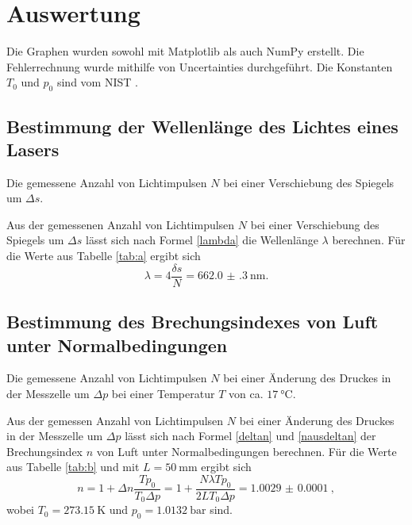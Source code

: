 \section{Auswertung}
\label{sec:Auswertung}


Die Graphen wurden sowohl mit Matplotlib \cite{matplotlib} als auch NumPy \cite{numpy} erstellt. Die
Fehlerrechnung wurde mithilfe von Uncertainties \cite{uncertainties} durchgeführt.
Die Konstanten $T_0$ und $p_0$ sind vom NIST \cite{nistgov}.

\subsection{Bestimmung der Wellenlänge des Lichtes eines Lasers}
\begin{table}
	\centering
	\caption{Die gemessene Anzahl von Lichtimpulsen $N$ bei einer Verschiebung des Spiegels um $\Delta s$.}
	
	\label{tab:a}
\end{table}
Aus der gemessenen Anzahl von Lichtimpulsen $N$ bei einer Verschiebung des Spiegels um $\Delta s$ lässt sich nach Formel \eqref{lambda} die Wellenlänge $\lambda$ berechnen.
Für die Werte aus Tabelle \ref{tab:a} ergibt sich
\begin{equation}
	\lambda = 4 \frac{\delta s}{N}=\SI{662.0(3)}{\nano\meter}.
\end{equation}


\subsection{Bestimmung des Brechungsindexes von Luft unter Normalbedingungen}
\begin{table}
	\centering
	\caption{Die gemessene Anzahl von Lichtimpulsen $N$ bei einer Änderung des Druckes in der Messzelle um $\Delta p$ bei einer Temperatur $T$ von ca. $\SI{17}{\degreeCelsius}$.}
	
	\label{tab:b}
\end{table}
Aus der gemessen Anzahl von Lichtimpulsen $N$ bei einer Änderung des Druckes in der Messzelle um $\Delta p$ lässt sich nach Formel \eqref{deltan} und \eqref{nausdeltan} der Brechungsindex $n$ von Luft unter Normalbedingungen berechnen.
Für die Werte aus Tabelle \ref{tab:b} und mit $L=\SI{50}{\milli\meter}$ ergibt sich
\begin{equation}
	n = 1 + \Delta n \frac{T p_0}{T_0 \Delta p} = 1+ \frac{N \lambda T p_0}{2 L T_0 \Delta p} = \SI{1.0029(1)}{},
\end{equation}
wobei $T_0=\SI{273,15}{\kelvin}$ und $p_0=\SI{1,0132}{\bar}$ sind.
